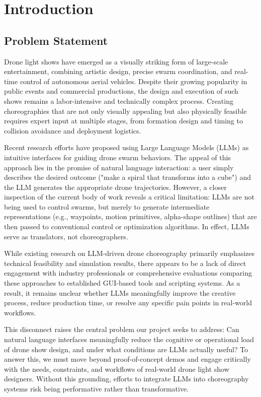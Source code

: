 \newpage
{}
\setcounter{page}{1}
\section{Introduction}
\subsection{Problem Statement}
Drone light shows have emerged as a visually striking form of large-scale entertainment, combining artistic design, precise swarm coordination, and real-time control of autonomous aerial vehicles. Despite their growing popularity in public events and commercial productions, the design and execution of such shows remains a labor-intensive and technically complex process. Creating choreographies that are not only visually appealing but also physically feasible requires expert input at multiple stages, from formation design and timing to collision avoidance and deployment logistics.

Recent research efforts have proposed using Large Language Models (LLMs) as intuitive interfaces for guiding drone swarm behaviors. The appeal of this approach lies in the promise of natural language interaction: a user simply describes the desired outcome ("make a spiral that transforms into a cube") and the LLM generates the appropriate drone trajectories. However, a closer inspection of the current body of work reveals a critical limitation: LLMs are not being used to control swarms, but merely to generate intermediate representations (e.g., waypoints, motion primitives, alpha-shape outlines) that are then passed to conventional control or optimization algorithms. In effect, LLMs serve as translators, not choreographers.

While existing research on LLM-driven drone choreography primarily emphasizes technical feasibility and simulation results, there appears to be a lack of direct engagement with industry professionals or comprehensive evaluations comparing these approaches to established GUI-based tools and scripting systems. As a result, it remains unclear whether LLMs meaningfully improve the creative process, reduce production time, or resolve any specific pain points in real-world workflows.

This disconnect raises the central problem our project seeks to address: Can natural language interfaces meaningfully reduce the cognitive or operational load of drone show design, and under what conditions are LLMs actually useful? To answer this, we must move beyond proof-of-concept demos and engage critically with the needs, constraints, and workflows of real-world drone light show designers. Without this grounding, efforts to integrate LLMs into choreography systems risk being performative rather than transformative.


